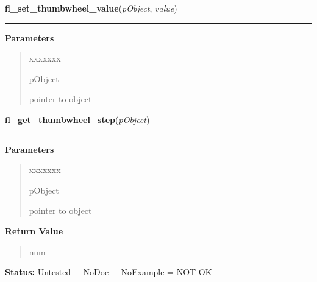 \hspace{.8\funcindent}\begin{boxedminipage}{\funcwidth}

    \raggedright \textbf{fl\_set\_thumbwheel\_value}(\textit{pObject}, \textit{value})

    \vspace{-1.5ex}

    \rule{\textwidth}{0.5\fboxrule}
\setlength{\parskip}{2ex}
\setlength{\parskip}{1ex}
      \textbf{Parameters}
      \vspace{-1ex}

      \begin{quote}
        \begin{Ventry}{xxxxxxx}

          \item[pObject]

          pointer to object

        \end{Ventry}

      \end{quote}

    \end{boxedminipage}

    \label{xformslib:library:fl_get_thumbwheel_step}

    \vspace{0.5ex}

\hspace{.8\funcindent}\begin{boxedminipage}{\funcwidth}

    \raggedright \textbf{fl\_get\_thumbwheel\_step}(\textit{pObject})

    \vspace{-1.5ex}

    \rule{\textwidth}{0.5\fboxrule}
\setlength{\parskip}{2ex}
\setlength{\parskip}{1ex}
      \textbf{Parameters}
      \vspace{-1ex}

      \begin{quote}
        \begin{Ventry}{xxxxxxx}

          \item[pObject]

          pointer to object

        \end{Ventry}

      \end{quote}

      \textbf{Return Value}
    \vspace{-1ex}

      \begin{quote}
      num

      \end{quote}

\textbf{Status:} Untested + NoDoc + NoExample = NOT OK



    \end{boxedminipage}

